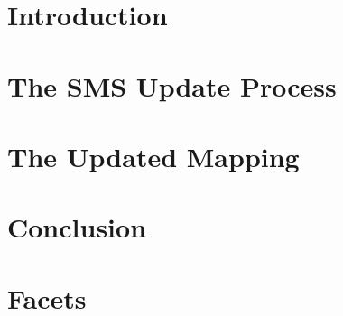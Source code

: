 \documentclass[sigconf]{acmart}
\begin{document}

\maketitle

\section{Introduction} \label{sec:introduction}


\section{The SMS Update Process} \label{sec:sms:process}


\section{The Updated Mapping} \label{sec:updated:sms}


%

\section{Conclusion} \label{sec:conclusion}





\appendix
\section{Facets} \label{sec:facets}








\end{document}
